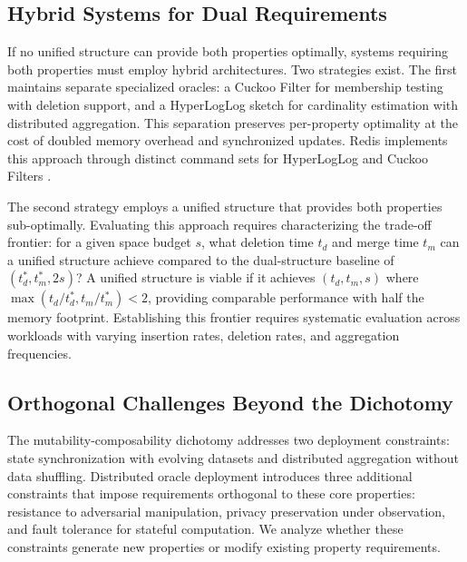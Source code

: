 \subsection{Hybrid Systems for Dual Requirements}
\label{subsec:hybrid-architectures}

If no unified structure can provide both properties optimally, systems requiring both properties must employ hybrid architectures. Two strategies exist. The first maintains separate specialized oracles: a Cuckoo Filter for membership testing with deletion support, and a HyperLogLog sketch for cardinality estimation with distributed aggregation. This separation preserves per-property optimality at the cost of doubled memory overhead and synchronized updates. Redis implements this approach through distinct command sets for HyperLogLog and Cuckoo Filters \cite{redis-hll, redis-cuckoo-filters}.

The second strategy employs a unified structure that provides both properties sub-optimally. Evaluating this approach requires characterizing the trade-off frontier: for a given space budget $s$, what deletion time $t_d$ and merge time $t_m$ can a unified structure achieve compared to the dual-structure baseline of $(t_d^*, t_m^*, 2s)$? A unified structure is viable if it achieves $(t_d, t_m, s)$ where $\max(t_d/t_d^*, t_m/t_m^*) < 2$, providing comparable performance with half the memory footprint. Establishing this frontier requires systematic evaluation across workloads with varying insertion rates, deletion rates, and aggregation frequencies.

\subsection{Orthogonal Challenges Beyond the Dichotomy}
\label{subsec:orthogonal-challenges}

The mutability-composability dichotomy addresses two deployment constraints: state synchronization with evolving datasets and distributed aggregation without data shuffling. Distributed oracle deployment introduces three additional constraints that impose requirements orthogonal to these core properties: resistance to adversarial manipulation, privacy preservation under observation, and fault tolerance for stateful computation. We analyze whether these constraints generate new properties or modify existing property requirements.

